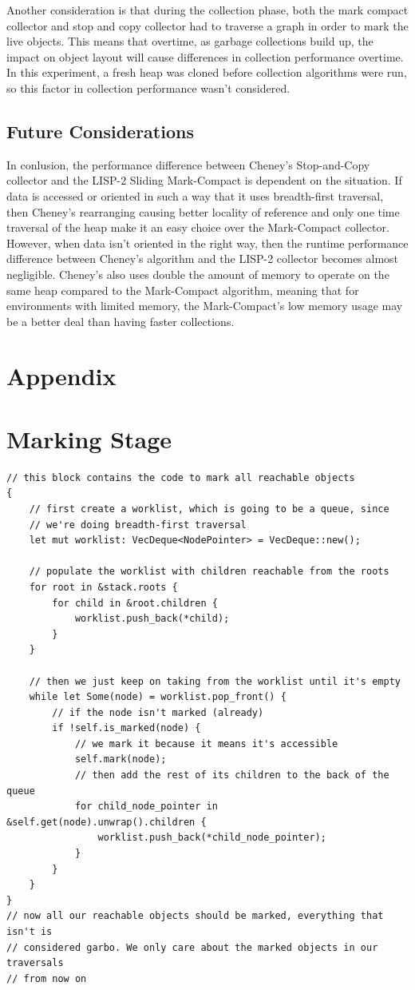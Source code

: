 \documentclass[index]{subfiles}
\begin{document}
Another consideration is that during the collection phase, both the mark compact collector and stop and copy collector had to traverse a graph in order to mark the live objects. This means that overtime, as garbage collections build up, the impact on object layout will cause differences in collection performance overtime. In this experiment, a fresh heap was cloned before collection algorithms were run, so this factor in collection performance wasn't considered.

\subsection{Future Considerations}

In conlusion, the performance difference between Cheney's Stop-and-Copy collector and the LISP-2 Sliding Mark-Compact is dependent on the situation. If data is accessed or oriented in such a way that it uses breadth-first traversal, then Cheney's rearranging causing better locality of reference and only one time traversal of the heap make it an easy choice over the Mark-Compact collector. However, when data isn't oriented in the right way, then the runtime performance difference between Cheney's algorithm and the LISP-2 collector becomes almost negligible. Cheney's also uses double the amount of memory to operate on the same heap compared to the Mark-Compact algorithm, meaning that for environments with limited memory, the Mark-Compact's low memory usage may be a better deal than having faster collections.

\section{Appendix}

\appendix
\section{Marking Stage}
\begin{verbatim}
// this block contains the code to mark all reachable objects
{
    // first create a worklist, which is going to be a queue, since
    // we're doing breadth-first traversal
    let mut worklist: VecDeque<NodePointer> = VecDeque::new();

    // populate the worklist with children reachable from the roots
    for root in &stack.roots {
        for child in &root.children {
            worklist.push_back(*child);
        }
    }

    // then we just keep on taking from the worklist until it's empty
    while let Some(node) = worklist.pop_front() {
        // if the node isn't marked (already)
        if !self.is_marked(node) {
            // we mark it because it means it's accessible
            self.mark(node);
            // then add the rest of its children to the back of the queue
            for child_node_pointer in &self.get(node).unwrap().children {
                worklist.push_back(*child_node_pointer);
            }
        }
    }
}
// now all our reachable objects should be marked, everything that isn't is
// considered garbo. We only care about the marked objects in our traversals
// from now on
\end{verbatim}
\end{document}
